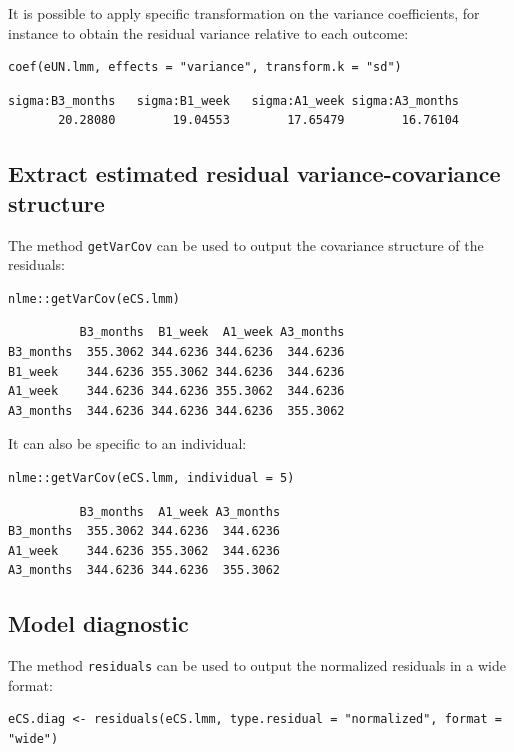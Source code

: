 \documentclass[12pt]{article}
\begin{document}
It is possible to apply specific transformation on the variance
coefficients, for instance to obtain the residual variance relative to
each outcome:
\lstset{language=r,label= ,caption= ,captionpos=b,numbers=none}
\begin{lstlisting}
coef(eUN.lmm, effects = "variance", transform.k = "sd")
\end{lstlisting}

\begin{verbatim}
sigma:B3_months   sigma:B1_week   sigma:A1_week sigma:A3_months 
       20.28080        19.04553        17.65479        16.76104
\end{verbatim}

\subsection{Extract estimated residual variance-covariance structure}
\label{sec:orga477af4}

The method \texttt{getVarCov} can be used to output the covariance structure of the residuals:
\lstset{language=r,label= ,caption= ,captionpos=b,numbers=none}
\begin{lstlisting}
nlme::getVarCov(eCS.lmm)
\end{lstlisting}

\begin{verbatim}
          B3_months  B1_week  A1_week A3_months
B3_months  355.3062 344.6236 344.6236  344.6236
B1_week    344.6236 355.3062 344.6236  344.6236
A1_week    344.6236 344.6236 355.3062  344.6236
A3_months  344.6236 344.6236 344.6236  355.3062
\end{verbatim}


It can also be specific to an individual:
\lstset{language=r,label= ,caption= ,captionpos=b,numbers=none}
\begin{lstlisting}
nlme::getVarCov(eCS.lmm, individual = 5)
\end{lstlisting}

\begin{verbatim}
          B3_months  A1_week A3_months
B3_months  355.3062 344.6236  344.6236
A1_week    344.6236 355.3062  344.6236
A3_months  344.6236 344.6236  355.3062
\end{verbatim}


\clearpage

\subsection{Model diagnostic}
\label{sec:org33a350f}
The method \texttt{residuals} can be used to output the normalized residuals in a wide format:
\lstset{language=r,label= ,caption= ,captionpos=b,numbers=none}
\begin{lstlisting}
eCS.diag <- residuals(eCS.lmm, type.residual = "normalized", format = "wide")
\end{lstlisting}
\end{document}

